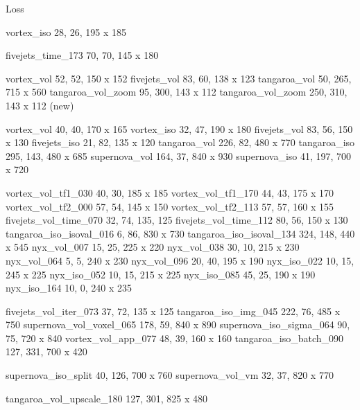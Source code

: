 Loss

vortex_iso 28, 26, 195 x 185

fivejets_time_173 70, 70, 145 x 180

vortex_vol   52, 52, 150 x 152
fivejets_vol 83, 60, 138 x 123
tangaroa_vol 50, 265, 715 x 560
tangaroa_vol_zoom 95, 300, 143 x 112
tangaroa_vol_zoom 250, 310, 143 x 112 (new)

vortex_vol 40, 40, 170 x 165
vortex_iso 32, 47, 190 x 180
fivejets_vol 83, 56, 150 x 130
fivejets_iso 21, 82, 135 x 120
tangaroa_vol 226, 82, 480 x 770
tangaroa_iso 295, 143, 480 x 685
supernova_vol 164, 37, 840 x 930
supernova_iso 41, 197, 700 x 720

vortex_vol_tf1_030 40, 30, 185 x 185
vortex_vol_tf1_170 44, 43, 175 x 170
vortex_vol_tf2_000 57, 54, 145 x 150
vortex_vol_tf2_113 57, 57, 160 x 155
fivejets_vol_time_070 32, 74, 135, 125
fivejets_vol_time_112 80, 56, 150 x 130
tangaroa_iso_isoval_016 6, 86, 830 x 730
tangaroa_iso_isoval_134 324, 148, 440 x 545
nyx_vol_007 15, 25, 225 x 220
nyx_vol_038 30, 10, 215 x 230
nyx_vol_064 5, 5, 240 x 230
nyx_vol_096 20, 40, 195 x 190
nyx_iso_022 10, 15, 245 x 225
nyx_iso_052 10, 15, 215 x 225
nyx_iso_085 45, 25, 190 x 190
nyx_iso_164 10, 0, 240 x 235

fivejets_vol_iter_073 37, 72, 135 x 125
tangaroa_iso_img_045 222, 76, 485 x 750
supernova_vol_voxel_065 178, 59, 840 x 890
supernova_iso_sigma_064 90, 75, 720 x 840
vortex_vol_app_077 48, 39, 160 x 160
tangaroa_iso_batch_090 127, 331, 700 x 420

supernova_iso_split 40, 126, 700 x 760
supernova_vol_vm 32, 37, 820 x 770


tangaroa_vol_upscale_180 127, 301, 825 x 480